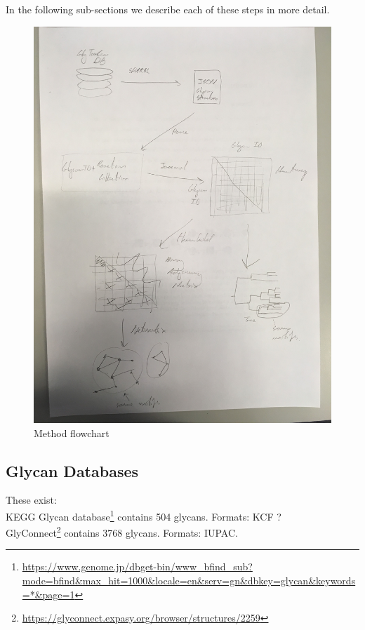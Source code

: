 \documentclass[12pt,a4paper]{article}
\begin{document}
In the following sub-sections we describe each of these steps in more detail.

\begin{figure}[H]
\centering 
\includegraphics[scale=0.12]{images/flowchart.JPG} 
\caption{Method flowchart}
\label{fig:flowchart}
\end{figure}

\subsection{Glycan Databases}
\label{sec:glycan_databases}
These exist:\\

KEGG Glycan database\footnote{\url{https://www.genome.jp/dbget-bin/www_bfind_sub?mode=bfind&max_hit=1000&locale=en&serv=gn&dbkey=glycan&keywords=*&page=1}} contains 504 glycans. Formats: KCF ?\\

GlyConnect\footnote{\url{https://glyconnect.expasy.org/browser/structures/2259}} contains 3768 glycans. Formats: IUPAC.\\
\end{document}
